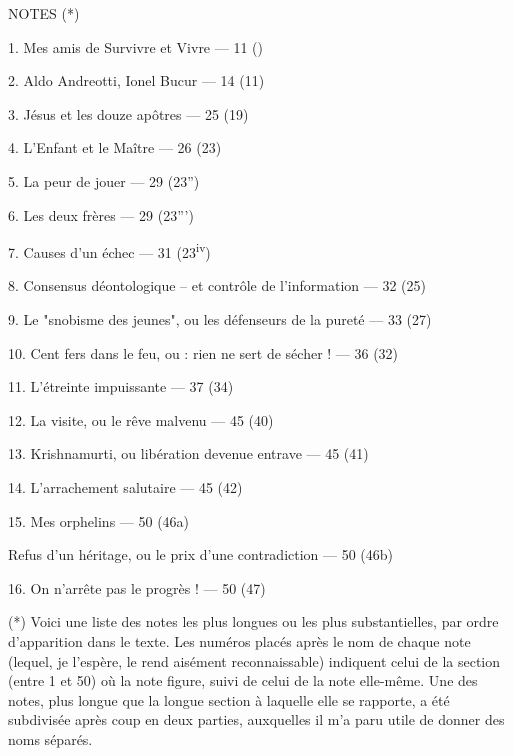 \documentclass[11pt,a4paper]{article}
\begin{document}
NOTES (*)

1. Mes amis de Survivre et Vivre — 11 ()

2. Aldo Andreotti, Ionel Bucur — 14 (11)

3. Jésus et les douze apôtres — 25 (19)

4. L'Enfant et le Maître — 26 (23)

5. La peur de jouer — 29 (23'')

6. Les deux frères — 29 (23''')

7. Causes d'un échec — 31 (23\textsuperscript{iv})

8. Consensus déontologique -- et contrôle de l'information — 32 (25)

9. Le "snobisme des jeunes", ou les défenseurs de la pureté — 33 (27)

10. Cent fers dans le feu, ou : rien ne sert de sécher ! — 36 (32)

11. L'étreinte impuissante — 37 (34)

12. La visite, ou le rêve malvenu — 45 (40)

13. Krishnamurti, ou \struck{\ill{}}  libération devenue entrave — 45 (41)

14. L'arrachement salutaire — 45 (42)

15. Mes orphelins — 50 (46a)

Refus d'un héritage, ou le prix d'une contradiction — 50 (46b)

16. On n'arrête pas le progrès ! — 50 (47)

(*) Voici une liste des notes les plus longues ou les plus substantielles, par ordre d'apparition dans le texte. Les numéros placés après le nom de chaque note (lequel, je l'espère, le rend aisément reconnaissable) indiquent celui de la section (entre 1 et 50) où la note figure, suivi de celui de la note elle-même. Une des notes, plus longue que la longue section à laquelle elle se rapporte, a été subdivisée après coup en deux parties, auxquelles il m'a paru utile de donner des noms séparés.

\end{document}
